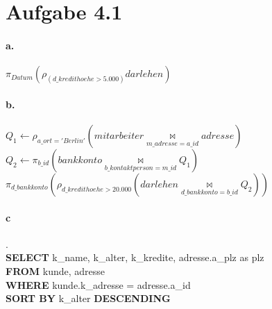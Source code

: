 \documentclass{article}
\begin{document}
	
	
	
	
	
	\section*{Aufgabe 4.1}
		\paragraph*{a.}
			$\pi_{Datum}(\rho_{(d\_kredithoehe>5.000)} darlehen)$
			
		\paragraph*{b.}
			$Q_1 \leftarrow \rho_{a\_ort = 'Berlin'}(mitarbeiter \underset{m\_adresse = a\_id}{\bowtie} adresse)$ \\[1.2em]
			
			$Q_2 \leftarrow \pi_{b\_id}(bankkonto \underset{b\_kontaktperson = m\_id}{\bowtie} Q_1)$
			\\[1.2em]
			
			$\pi_{d\_bankkonto}(\rho_{d\_kredithoehe > 20.000}(darlehen \underset{d\_bankkonto = b\_id}{\bowtie} Q_2))$\\
			
			
		\paragraph*{c}.\\
			\textbf{SELECT} k\_name, k\_alter, k\_kredite, adresse.a\_plz as plz\\
			\textbf{FROM} kunde, adresse\\
			\textbf{WHERE} kunde.k\_adresse = adresse.a\_id\\
			\textbf{SORT BY} k\_alter \textbf{DESCENDING}
			
\end{document}
